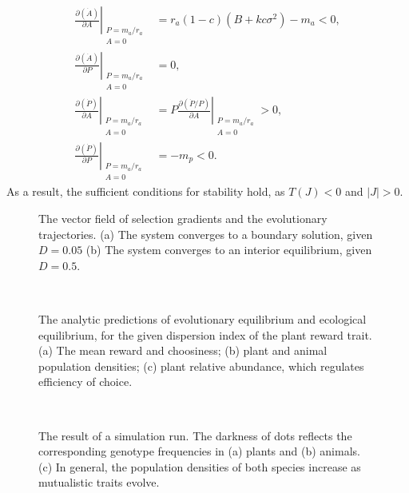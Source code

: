 \documentclass[12pt]{article}
\begin{document}
\begin{subequations}
\begin{align}
\left.\frac{\partial (\dot{A})}{\partial A}\right|_{\substack{P=m_a/r_a\\ A=0}} &= r_a(1-c)(B+k c \sigma^2) -m_a < 0,\\ 
\left.\frac{\partial (\dot{A})}{\partial P}\right|_{\substack{P=m_a/r_a\\ A=0}} &= 0, \\
\left.\frac{\partial (\dot{P})}{\partial A}\right|_{\substack{P=m_a/r_a\\ A=0}} &= \left. P \frac{\partial(\dot{P}/P)}{\partial A}\right|_{\substack{P=m_a/r_a\\ A=0}}>0, \\	
\left.\frac{\partial (\dot{P})}{\partial P}\right|_{\substack{P=m_a/r_a\\ A=0}} &= -m_p < 0.																		
\end{align}
\end{subequations}
As a result, the sufficient conditions for stability hold, as $T(J)<0$ and $|J|>0$.

\clearpage
\begin{figure}
\centering
	\caption{The vector field of selection gradients and the evolutionary trajectories. (a) The system converges to a boundary solution, given $D=0.05$ (b) The system converges to an interior equilibrium, given $D=0.5$.}
	\label{fig:VectorField}
\end{figure}

\clearpage
\begin{figure}
	\centering
	 \\
	\caption{The analytic predictions of evolutionary equilibrium and ecological equilibrium, for the given dispersion index of the plant reward trait. (a) The mean reward and choosiness; (b) plant and animal population densities; (c) plant relative abundance, which regulates efficiency of choice.}
	\label{fig:D-Eqm}
\end{figure}

\clearpage
\begin{figure}
\\
\label{fig:Simulation}
\caption{The result of a simulation run. The darkness of dots reflects the corresponding genotype frequencies in (a) plants and (b) animals. (c) In general, the population densities of both species increase as mutualistic traits evolve.}
\end{figure}
\end{document}
